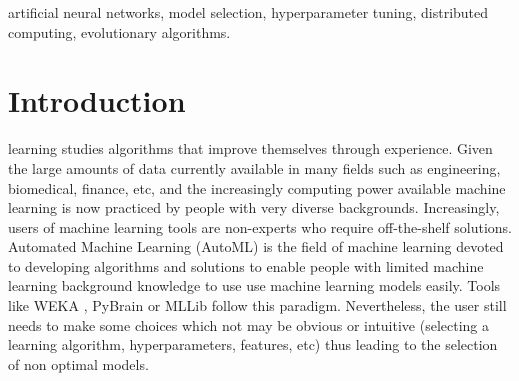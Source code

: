 \documentclass[journal]{IEEEtran}
\begin{document}
\begin{IEEEkeywords}
artificial neural networks, model selection, hyperparameter tuning, distributed computing, evolutionary algorithms.
\end{IEEEkeywords}






%



\section{Introduction}
% 
% 
% 
% 
 learning studies algorithms that improve themselves through experience. Given the large amounts of data currently available in many fields such as engineering, biomedical, finance, etc, and the increasingly computing power available machine learning is now practiced by people with very diverse backgrounds. Increasingly, users of machine learning tools are non-experts who require off-the-shelf solutions. Automated Machine Learning (AutoML) is the field of machine learning devoted to developing algorithms and solutions to enable people with limited machine learning background knowledge to use use machine learning models easily. Tools like WEKA \cite{Hall2009}, PyBrain \cite{Schaul2010} or MLLib \cite{mlib2017} follow this paradigm. Nevertheless, the user still needs to make some choices which not may be obvious or intuitive (selecting a learning algorithm, hyperparameters, features, etc) thus leading to the selection of non optimal models.
\end{document}
